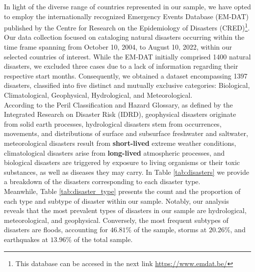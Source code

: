 \documentclass{article}
\begin{document}
In light of the diverse range of countries represented in our sample, we have opted to employ the internationally recognized Emergency Events Database (EM-DAT) published by the Centre for Research on the Epidemiology of Disasters (CRED)\footnote{This database can be 
accesed in the next link \href{https://www.emdat.be/}{https://www.emdat.be/}}. Our data collection focused on cataloging natural disasters occurring within the time frame spanning from October 10, 2004, to August 10, 2022, within our selected countries of interest. While the EM-DAT initially comprised 1400 natural disasters, we excluded three cases due to a lack of information regarding their respective start months. Consequently, we obtained a dataset encompassing 1397 disasters, classified into five distinct and mutually exclusive categories: Biological, Climatological, Geophysical, Hydrological, and Meteorological. \\
According to the Peril Classification and Hazard Glossary, as defined by the Integrated Research on Disaster Risk (IDRD), geophysical disasters originate from solid earth processes, hydrological disasters stem from occurrences, movements, and distributions of surface and subsurface freshwater and saltwater, meteorological disasters result from \textbf{short-lived} extreme weather conditions, climatological disasters arise from \textbf{long-lived} atmospheric processes, and biological disasters are triggered by exposure to living organisms or their toxic substances, as well as diseases they may carry. In Table \ref{tab:disasters} we provide a breakdown of the disasters corresponding to each disaster type.\\
Meanwhile, Table \ref{tab:disaster_type} presents the count and the proportion of each type and subtype of disaster within our sample. Notably, our analysis reveals that the most prevalent types of disasters in our sample are hydrological, meteorological, and geophysical. Conversely, the most frequent subtypes of disasters are floods, accounting for $46.81\%$ of the sample, storms at $20.26\%$, and earthquakes at $13.96\%$ of the total sample.
\end{document}
